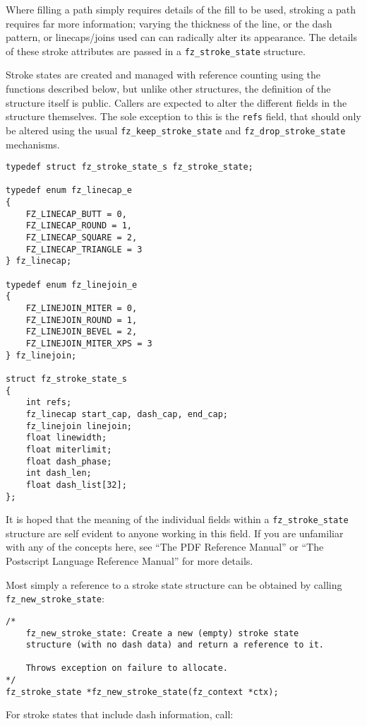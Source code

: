 \documentclass[oneside]{book}
\begin{document}
Where filling a path simply requires details of the fill to be used, stroking a path requires far more information; varying the thickness of the line, or the dash pattern, or linecaps/joins used can can radically alter its appearance. The details of these stroke attributes are passed in a \texttt{fz\_stroke\_state} structure.

Stroke states are created and managed with reference counting using the functions described below, but unlike other structures, the definition of the structure itself is public. Callers are expected to alter the different fields in the structure themselves. The sole exception to this is the \texttt{refs} field, that should only be altered using the usual \texttt{fz\_keep\_stroke\_state} and \texttt{fz\_drop\_stroke\_state} mechanisms.

\begin{lstlisting}
typedef struct fz_stroke_state_s fz_stroke_state;

typedef enum fz_linecap_e
{
	FZ_LINECAP_BUTT = 0,
	FZ_LINECAP_ROUND = 1,
	FZ_LINECAP_SQUARE = 2,
	FZ_LINECAP_TRIANGLE = 3
} fz_linecap;

typedef enum fz_linejoin_e
{
	FZ_LINEJOIN_MITER = 0,
	FZ_LINEJOIN_ROUND = 1,
	FZ_LINEJOIN_BEVEL = 2,
	FZ_LINEJOIN_MITER_XPS = 3
} fz_linejoin;

struct fz_stroke_state_s
{
	int refs;
	fz_linecap start_cap, dash_cap, end_cap;
	fz_linejoin linejoin;
	float linewidth;
	float miterlimit;
	float dash_phase;
	int dash_len;
	float dash_list[32];
};
\end{lstlisting}

It is hoped that the meaning of the individual fields within a \texttt{fz\_stroke\_state} structure are self evident to anyone working in this field. If you are unfamiliar with any of the concepts here, see 
``The PDF Reference Manual'' or ``The Postscript Language Reference Manual'' for more details.

Most simply a reference to a stroke state structure can be obtained by calling \texttt{fz\_new\_stroke\_state}:

\begin{lstlisting}
/*
	fz_new_stroke_state: Create a new (empty) stroke state
	structure (with no dash data) and return a reference to it.

	Throws exception on failure to allocate.
*/
fz_stroke_state *fz_new_stroke_state(fz_context *ctx);
\end{lstlisting}

For stroke states that include dash information, call:
\end{document}
